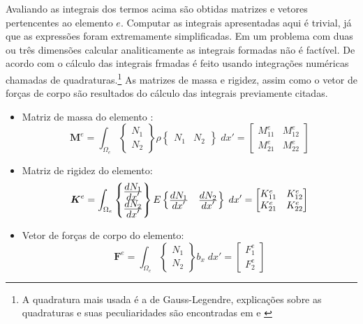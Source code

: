 Avaliando as integrais dos termos acima são obtidas matrizes e vetores pertencentes ao elemento $e$. Computar as integrais apresentadas aqui é trivial, já que as expressões foram extremamente simplificadas. Em um problema com duas ou três dimensões calcular analiticamente as integrais formadas não é factível. De acordo com \cite{zienkiewicz2013} o cálculo das integrais frmadas é feito usando integrações numéricas chamadas de quadraturas.\footnote{A quadratura mais usada é a de Gauss-Legendre, explicações sobre as quadraturas e suas peculiaridades são encontradas em \cite{Paulo} e \cite{zienkiewicz2013}} As matrizes de massa e rigidez, assim como o vetor de forças de corpo são resultados do cálculo das integrais previamente citadas. 

\begin{itemize}
    \item Matriz de massa do elemento : \begin{equation} \boldsymbol{M}^e = \int_{\Omega_e} \begin{Bmatrix} N_1 \\ N_2 \end{Bmatrix} \rho \begin{Bmatrix} N_1 & N_2 \end{Bmatrix} \; dx' = \begin{bmatrix} M^e_{11} & M^e_{12} \\ M^e_{21} & M^e_{22} \end{bmatrix} \end{equation} 
    \item Matriz de rigidez do elemento: \begin{equation}
        \boldsymbol{K}^e = \int_{\Omega_e} \begin{Bmatrix} \frac{\displaystyle dN_1}{\displaystyle dx'} \\ \frac{\displaystyle dN_2}{\displaystyle dx'}  \end{Bmatrix} E \begin{Bmatrix} \frac{\displaystyle dN_1}{\displaystyle dx'}  & \frac{\displaystyle dN_2}{\displaystyle dx'}  \end{Bmatrix} \; dx' = \begin{bmatrix} K^e_{11} & K^e_{12} \\ K^e_{21} & K^e_{22} \end{bmatrix}
    \end{equation}
    
    \item Vetor de forças de corpo do elemento: 
    \begin{equation}
        \boldsymbol{F}^e = \int_{\Omega_e} \begin{Bmatrix} N_1 \\ N_2  \end{Bmatrix} b_x \; dx' = \begin{bmatrix} F^e_1 \\ F^e_2 \end{bmatrix}
    \end{equation}
\end{itemize}

